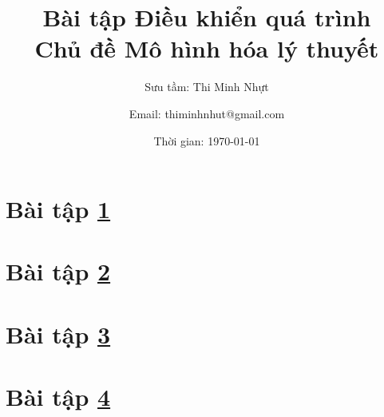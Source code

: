 \documentclass[12pt,a4paper]{article}
\title{\textbf{Bài tập Điều khiển quá trình \bigskip \\ Chủ đề Mô hình hóa lý thuyết}}
\author{Sưu tầm: Thi Minh Nhựt \and Email: thiminhnhut@gmail.com}
\date{Thời gian: \today}
\begin{document}
\maketitle

\section{Bài tập \ref{sec:baitap1-1binhchua}} \label{sec:baitap1-1binhchua}
    

\section{Bài tập \ref{sec:baitap2-1binhchua}} \label{sec:baitap2-1binhchua}
    

\section{Bài tập \ref{sec:baitap3-2binhchua}} \label{sec:baitap3-2binhchua}
    

\section{Bài tập \ref{sec:baitap4-2binhchua}} \label{sec:baitap4-2binhchua}
    
\end{document}
